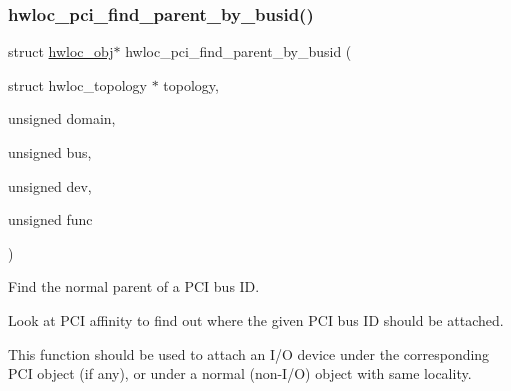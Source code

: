 \subsubsection{\texorpdfstring{hwloc\+\_\+pci\+\_\+find\+\_\+parent\+\_\+by\+\_\+busid()}{hwloc\_pci\_find\_parent\_by\_busid()}}
{\footnotesize\ttfamily struct \hyperlink{a00238}{hwloc\+\_\+obj}$\ast$ hwloc\+\_\+pci\+\_\+find\+\_\+parent\+\_\+by\+\_\+busid (\begin{DoxyParamCaption}\item[{struct hwloc\+\_\+topology $\ast$}]{topology,  }\item[{unsigned}]{domain,  }\item[{unsigned}]{bus,  }\item[{unsigned}]{dev,  }\item[{unsigned}]{func }\end{DoxyParamCaption})}



Find the normal parent of a P\+CI bus ID. 

Look at P\+CI affinity to find out where the given P\+CI bus ID should be attached.

This function should be used to attach an I/O device under the corresponding P\+CI object (if any), or under a normal (non-\/\+I/O) object with same locality. 